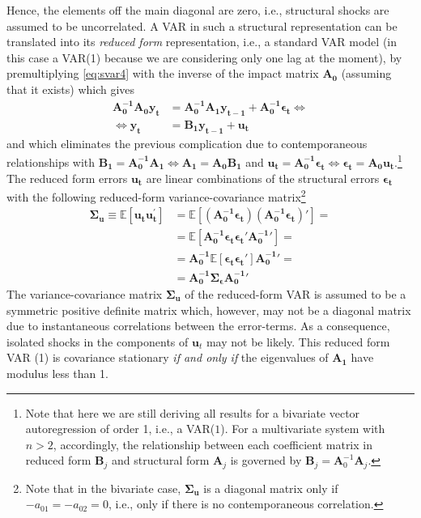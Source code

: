 \documentclass[a4paper,11pt,listof=nochaptergap,oneside,pointednumbers,bibtotoc,bigheadings,liststotoc]{scrbook}
\theoremstyle{mysatz}
\theoremstyle{mydefinition}
\theoremstyle{mytheorem}
\theoremstyle{mybemerkung}
\newcommand{\vect}[1]{\boldsymbol{\mathbf{#1}}}
\begin{document}
Hence, the elements off the main diagonal are zero, i.e., structural shocks are assumed to be uncorrelated. A VAR in such a structural representation can be translated into its \textit{reduced form} representation, i.e., a standard VAR model (in this case a VAR(1) because we are considering only one lag at the moment), by premultiplying \ref{eq:svar4} with the inverse of the impact matrix $\vect{A_0}$ (assuming that it exists) which gives
\begin{equation} \label{eq:svar5}
\begin{split}
	          \vect{A_0^{-1}}\vect{A_0}\vect{y_t} & = \vect{A_0^{-1}}\vect{A_1}\vect{y_{t-1}} + \vect{A_0^{-1}}\vect{\epsilon_t}     \iff \\
	\iff 						\vect{y_t} & = \vect{B_1}\vect{y_{t-1}} + \vect{u_t}
\end{split}								
\end{equation}
and which eliminates the previous complication due to contemporaneous relationships with $\vect{B_1} = \vect{A_0^{-1}}\vect{A_1} \iff \vect{A_1} = \vect{A_0}\vect{B_1}$ and $\vect{u_t} = \vect{A_0^{-1}}\vect{\epsilon_t} \iff \vect{\epsilon_t} = \vect{A_0}\vect{u_t}$.\footnote{Note that here we are still deriving all results for a bivariate vector autoregression of order 1, i.e., a VAR($1$). For a multivariate system with $n>2$, accordingly, the relationship between each coefficient matrix in reduced form $\vect{B}_j$ and structural form $\vect{A}_j$ is governed by $\vect{B}_j = \vect{A}_0^{-1}\vect{A}_j$.}\\
The reduced form errors $\vect{u_t}$ are linear combinations of the structural errors $\vect{\epsilon_t}$ with the following reduced-form variance-covariance matrix\footnote{Note that in the bivariate case, $\vect{\Sigma_u}$ is a diagonal matrix only if $-a_{01} = -a_{02} = 0$, i.e., only if there is no contemporaneous correlation.}
\begin{equation} \label{eq:svar6}
\begin{split}
 		\vect{\Sigma_u} \equiv \mathbb{E}[\vect{u_t}\vect{u_t^'}] & = \mathbb{E}[(\vect{A_0^{-1}}\vect{\epsilon_t}) (\vect{A_0^{-1}}\vect{\epsilon_t})' ] = \\
								& = \mathbb{E}[\vect{A_0^{-1}}\vect{\epsilon_t} \vect{\epsilon_t}'\vect{A_0^{-1}}'] = \\
								& = \vect{A_0^{-1}}\mathbb{E}[\vect{\epsilon_t} \vect{\epsilon_t}']\vect{A_0^{-1}}' = \\
								& = \vect{A_0^{-1}}\vect{\Sigma_\epsilon}\vect{A_0^{-1}}'
\end{split}								
\end{equation}
The variance-covariance matrix $\vect{\Sigma_u}$ of the reduced-form VAR is assumed to be a symmetric positive definite matrix which, however, may not be a diagonal matrix due to instantaneous correlations between the error-terms. As a consequence, isolated shocks in the components of $\vect{u}_t$ may not be likely. This reduced form VAR (1) is covariance stationary \textit{if and only if} the eigenvalues of $\vect{A_1}$ have modulus less than 1.\\
\end{document}
